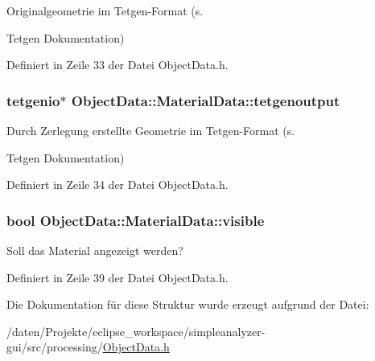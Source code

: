 Originalgeometrie im Tetgen-\/\-Format (s. 

Tetgen Dokumentation) 

Definiert in Zeile 33 der Datei Object\-Data.\-h.

\hypertarget{structObjectData_1_1MaterialData_a15d576cfe25abe334e34eb5e4671d6d7}{
\subsubsection[{tetgenoutput}]{\setlength{\rightskip}{0pt plus 5cm}tetgenio$\ast$ Object\-Data\-::\-Material\-Data\-::tetgenoutput}}\label{structObjectData_1_1MaterialData_a15d576cfe25abe334e34eb5e4671d6d7}


Durch Zerlegung erstellte Geometrie im Tetgen-\/\-Format (s. 

Tetgen Dokumentation) 

Definiert in Zeile 34 der Datei Object\-Data.\-h.

\hypertarget{structObjectData_1_1MaterialData_a37980da11f6b51b30eb41c3ab4e9674a}{
\subsubsection[{visible}]{\setlength{\rightskip}{0pt plus 5cm}bool Object\-Data\-::\-Material\-Data\-::visible}}\label{structObjectData_1_1MaterialData_a37980da11f6b51b30eb41c3ab4e9674a}


Soll das Material angezeigt werden? 



Definiert in Zeile 39 der Datei Object\-Data.\-h.



Die Dokumentation für diese Struktur wurde erzeugt aufgrund der Datei\-:\begin{DoxyCompactItemize}
\item 
/daten/\-Projekte/eclipse\-\_\-workspace/simpleanalyzer-\/gui/src/processing/\hyperlink{ObjectData_8h}{Object\-Data.\-h}\end{DoxyCompactItemize}
